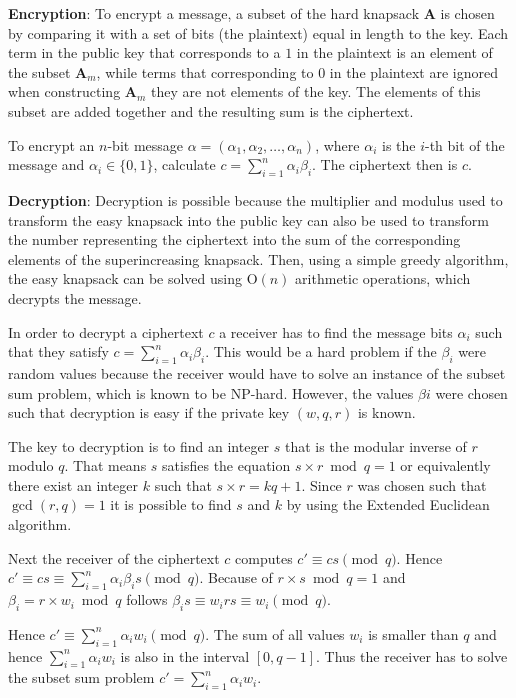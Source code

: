 \textbf{Encryption}: To encrypt a message, a subset of the hard knapsack $\textbf{A}$ is chosen by comparing it with a set of bits (the plaintext) equal in length to the key. Each term in the public key that corresponds to a $1$ in the plaintext is an element of the subset $\textbf{A}_m$, while terms that corresponding to $0$ in the plaintext are ignored when constructing $\textbf{A}_m$ they are not elements of the key. The elements of this subset are added together and the resulting sum is the ciphertext.

To encrypt an $n$-bit message $\alpha = (\alpha_1, \alpha_2, \dots, \alpha_n)$, where $\alpha_{i}$ is the $i$-th bit of the message and $\alpha_{i} \in \{0, 1\}$, calculate $c=\sum _{{i=1}}^{n}\alpha _{i}\beta _{i}$. The ciphertext then is $c$.


\textbf{Decryption}: Decryption is possible because the multiplier and modulus used to transform the easy knapsack into the public key can also be used to transform the number representing the ciphertext into the sum of the corresponding elements of the superincreasing knapsack. Then, using a simple greedy algorithm, the easy knapsack can be solved using $\text{O}(n)$ arithmetic operations, which decrypts the message.

In order to decrypt a ciphertext $c$ a receiver has to find the message bits $\alpha_{i}$ such that they satisfy $c=\sum _{{i=1}}^{n}\alpha_{i}\beta_{i}$. This would be a hard problem if the $\beta_i$ were random values because the receiver would have to solve an instance of the subset sum problem, which is known to be NP-hard. However, the values $\beta{i}$ were chosen such that decryption is easy if the private key $(w, q, r)$ is known.

The key to decryption is to find an integer $s$ that is the modular inverse of $r$ modulo $q$. That means $s$ satisfies the equation $s \times r \bmod q = 1$ or equivalently there exist an integer $k$ such that $s \times r = kq + 1$. Since $r$ was chosen such that $\gcd(r,q)=1$ it is possible to find $s$ and $k$ by using the Extended Euclidean algorithm.

Next the receiver of the ciphertext $c$ computes $c'\equiv cs{\pmod{q}}$. Hence $c'\equiv cs\equiv \sum _{{i=1}}^{n}\alpha _{i}\beta _{i}s{\pmod  {q}}$. Because of $r \times s \bmod q = 1$ and $\beta_{i} = r\times w_{i} \bmod q$ follows $\beta _{i}s\equiv w_{i}rs\equiv w_{i}{\pmod  {q}}$.

Hence $c'\equiv \sum _{{i=1}}^{n}\alpha _{i}w_{i}{\pmod  {q}}$. The sum of all values $w_{i}$ is smaller than $q$ and hence $\sum _{{i=1}}^{n}\alpha_{i}w_{i}$ is also in the interval $[0,q-1]$. Thus the receiver has to solve the subset sum problem $c'=\sum _{{i=1}}^{n}\alpha _{i}w_{i}$.

